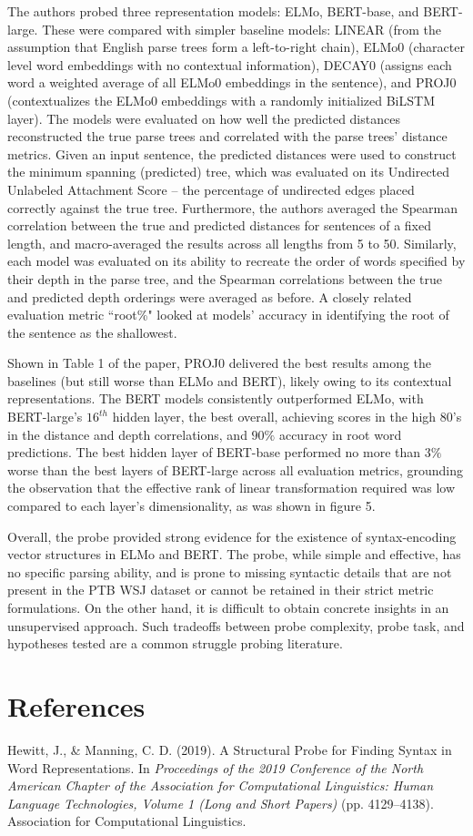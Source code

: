 \documentclass[11pt]{article}
\begin{document}
The authors probed three representation models: 
ELMo, BERT-base, and BERT-large. 
These were compared with simpler baseline 
models: LINEAR (from the assumption
that English parse trees form a left-to-right
chain), ELMo0 (character level word embeddings with no contextual information), 
DECAY0 (assigns each word a weighted average
of all ELMo0 embeddings in the sentence), 
and PROJ0 (contextualizes the ELMo0 embeddings
with a randomly initialized BiLSTM layer).
The models were evaluated on how well the predicted
distances reconstructed the true parse trees 
and correlated with the parse trees’
distance metrics. Given an input sentence, the predicted distances
were used to construct the minimum spanning (predicted) tree, 
which was evaluated on its Undirected Unlabeled Attachment Score – 
the percentage of undirected edges placed correctly
against the true tree. Furthermore, the authors
averaged the Spearman correlation between 
the true and predicted distances for 
sentences of a fixed length,
and macro-averaged the results
across all lengths from 5 to 50.
Similarly, each model was evaluated
on its ability to recreate the order of words 
specified by their depth in the parse tree,
and the Spearman correlations between
the true and predicted depth orderings
were averaged as before. 
A closely related evaluation metric ``root\%"
looked at models’ accuracy in identifying the 
root of the sentence as the shallowest.


Shown in Table 1 of the paper, 
PROJ0 delivered the best results among the baselines (but still worse than ELMo and BERT),
likely owing to its contextual representations.
The BERT models consistently outperformed ELMo, 
with BERT-large's $16^{th}$ hidden layer,
the best overall, achieving scores in the 
high $80$'s in the distance and depth correlations, 
and $90\%$ accuracy in root word predictions.
The best hidden layer of BERT-base
performed no more than $3\%$ worse than the best layers of BERT-large
across all evaluation metrics, grounding the observation that the 
effective rank of linear transformation required 
was low compared to each layer's dimensionality, as was shown in figure 5.

Overall, the probe provided strong evidence for the existence of
syntax-encoding vector structures in ELMo and BERT. The probe,
while simple and effective, has no specific parsing ability, and is prone 
to missing syntactic details that are not present in the PTB WSJ dataset or
cannot be retained in their strict metric formulations. On the other hand, it 
is difficult to obtain concrete insights in an unsupervised approach.
Such tradeoffs between probe complexity, probe task, and hypotheses tested
are a common struggle probing literature.


\section*{References}
Hewitt, J., \& Manning, C. D. (2019). A Structural Probe for Finding Syntax in Word Representations. In \textit{Proceedings of the 2019 Conference of the North American Chapter of the Association for Computational Linguistics: Human Language Technologies, Volume 1 (Long and Short Papers)} (pp. 4129–4138). Association for Computational Linguistics.
\end{document}
